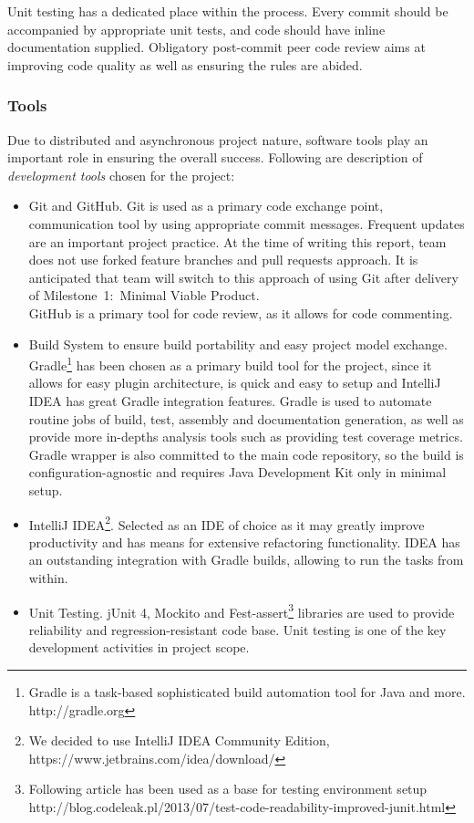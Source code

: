 Unit testing has a dedicated place within the process. Every commit should be accompanied by appropriate unit tests, and code should have
inline documentation supplied. Obligatory post-commit peer code review aims at improving code quality as well as ensuring the rules are abided.

\subsubsection{Tools}

Due to distributed and asynchronous project nature, software tools play an important role in ensuring the overall success. Following are description of \emph{development tools} chosen for the project:

\begin{itemize}
	\item Git and GitHub. Git is used as a primary code exchange point, communication tool by using appropriate commit messages. Frequent updates are an
	important project practice. At the time of writing this report, team does not use forked feature branches and pull requests approach. It is anticipated that team will
	switch to this approach of using Git after delivery of Milestone~1:~Minimal Viable Product. \\GitHub is a primary tool for code review, as it allows for
	code commenting.
	\item Build System to ensure build portability and easy project model exchange.
	 Gradle\footnote{Gradle is a task-based sophisticated build automation tool for Java and more. http://gradle.org} has been chosen as a primary build tool for the project, since it allows for easy plugin architecture, is quick and easy to setup and IntelliJ IDEA has
	 great Gradle integration features. Gradle is used to automate routine jobs of build, test, assembly  and documentation generation,
	as well as provide more in-depths analysis tools such as providing test coverage metrics.\\Gradle wrapper is also committed to the main code repository, so the build
	is configuration-agnostic and requires Java Development Kit only in minimal setup.
	\item IntelliJ IDEA\footnote{We decided to use IntelliJ IDEA Community Edition, https://www.jetbrains.com/idea/download/}. Selected as an IDE of choice as it may greatly improve productivity and has means for extensive refactoring functionality. IDEA has an outstanding
	integration with Gradle builds, allowing to run the tasks from within.
	\item Unit Testing. jUnit 4, Mockito and Fest-assert\footnote{Following article has been used as a base for testing environment setup http://blog.codeleak.pl/2013/07/test-code-readability-improved-junit.html} libraries are used to provide reliability and regression-resistant code base. Unit testing is one of the key development
	activities in project scope.
\end{itemize}

